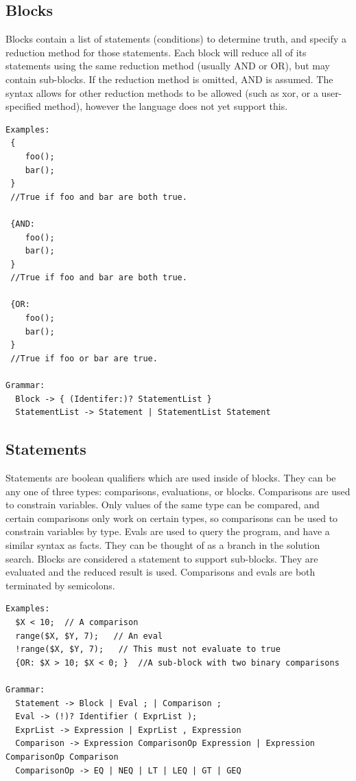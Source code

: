 \documentclass[onecolumn,titlepage]{article}
\begin{document}
\subsection{Blocks}
Blocks contain a list of statements (conditions) to determine truth, and specify a reduction 
method for those statements.  Each block will reduce all of its statements using the same
reduction method (usually AND or OR), but may contain sub-blocks.  If the reduction method
is omitted, AND is assumed.  The syntax allows for other reduction methods to be allowed
(such as xor, or a user-specified method), however the language does not yet support this.
\begin{verbatim}
Examples:
 { 
    foo();
    bar();
 }
 //True if foo and bar are both true.

 {AND:
    foo();
    bar();
 }
 //True if foo and bar are both true.

 {OR:
    foo();
    bar();
 }
 //True if foo or bar are true.

Grammar:
  Block -> { (Identifer:)? StatementList }
  StatementList -> Statement | StatementList Statement
\end{verbatim}

\subsection{Statements}
Statements are boolean qualifiers which are used inside of blocks.
They can be any one of three types: comparisons, evaluations, or
blocks. Comparisons are used to constrain variables.  Only values of
the same type can be compared, and certain comparisons only work on
certain types, so comparisons can be used to constrain variables by
type.  Evals are used to query the program, and have a similar syntax
as facts.  They can be thought of as a branch in the solution search.
Blocks are considered a statement to support sub-blocks.  They are
evaluated and the reduced result is used.  Comparisons and evals are
both terminated by semicolons.

\begin{verbatim}
Examples:
  $X < 10;  // A comparison
  range($X, $Y, 7);   // An eval
  !range($X, $Y, 7);   // This must not evaluate to true
  {OR: $X > 10; $X < 0; }  //A sub-block with two binary comparisons

Grammar:
  Statement -> Block | Eval ; | Comparison ;
  Eval -> (!)? Identifier ( ExprList );
  ExprList -> Expression | ExprList , Expression
  Comparison -> Expression ComparisonOp Expression | Expression ComparisonOp Comparison
  ComparisonOp -> EQ | NEQ | LT | LEQ | GT | GEQ
\end{verbatim}
\end{document}
